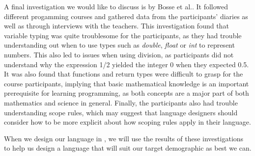 A final investigation we would like to discuss is by Bosse et al.\cite{bosseWhyProgrammingDifficult2017}.
It followed different progamming courses and gathered data from the participants' diaries as well as through interviews with the teachers.
This investigation found that variable typing was quite troublesome for the participants, as they had trouble understanding out when to use
types such as \emph{double}, \emph{float} or \emph{int} to represent numbers. This also led to issues when using division, as participants
did not understand why the expression 1/2 yielded the integer 0 when they expected 0.5.
It was also found that functions and return types were difficult to grasp for the course participants, implying that basic mathematical
knowledge is an important prerequisite for learning programming, as both concepts are a major part of both mathematics and science in general.
Finally, the participants also had trouble understanding scope rules, which may suggest that language designers should consider how to
be more explicit about how scoping rules apply in their language.


When we design our language in , we will use the results of these investigations to help us design a language that will suit our target demographic
as best we can.
